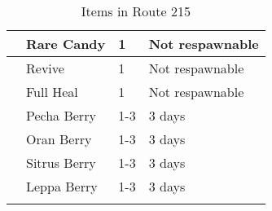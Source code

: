 \begin{longtable}{|| l l l l ||}%
\hline%
&Rare Candy&1&Not respawnable\\%
\hline%
&Revive&1&Not respawnable\\%
\hline%
&Full Heal&1&Not respawnable\\%
\hline%
&Pecha Berry&1{-}3&3 days\\%
\hline%
&Oran Berry&1{-}3&3 days\\%
\hline%
&Sitrus Berry&1{-}3&3 days\\%
\hline%
&Leppa Berry&1{-}3&3 days\\%
\hline%
\endhead%
\hline%
\caption{Items in Route 215}%
\label{tab:Route215Items}%
\end{longtable}